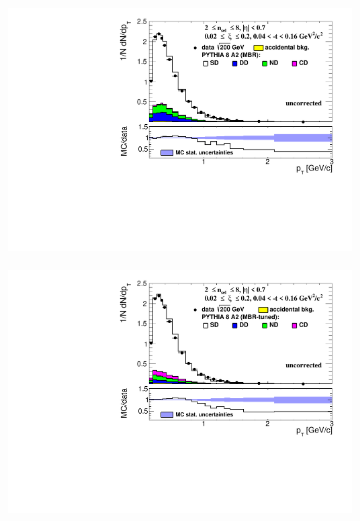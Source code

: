 \begin{figure}[h!]
	\centering
	\begin{subfigure}{.45\textwidth}
		\includegraphics[width=\linewidth, page=1]{chapters/chrgSTAR/img/nonSD/chrg/SDT_pythia_xi0_RP_starsim_pt.pdf}
	\end{subfigure}
	\begin{subfigure}{.45\textwidth}
		\includegraphics[width=\linewidth, page=1]{chapters/chrgSTAR/img/nonSD/chrg/SDT_pythia_xi0_option2_RP_starsim_pt.pdf}
	\end{subfigure}
	\begin{subfigure}{.45\textwidth}

\end{subfigure}
\end{figure}
